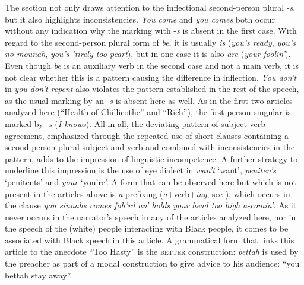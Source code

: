 The section not only draws attention to the inflectional second-person plural -\emph{s}, but it also highlights inconsistencies. \emph{You come} and \emph{you comes} both occur without any indication why the marking with -\emph{s} is absent in the first case. With regard to the second-person plural form of \emph{be}, it is usually \emph{is} (\emph{you’s ready}, \emph{you’s no mounah},\emph{ you’s ’tirely too peart}), but in one case it is also \emph{are} (\emph{your foolin’}). Even though \emph{be} is an auxiliary verb in the second case and not a main verb, it is not clear whether this is a pattern causing the difference in inflection. \emph{You don’t} in \emph{you don’t repent} also violates the pattern established in the rest of the speech, as the usual marking by an -\emph{s} is absent here as well. As in the first two articles analyzed here (“Health of Chillicothe” and “Rich”), the first-person singular is marked by -\emph{s} (\emph{I knows}). All in all, the deviating pattern of subject-verb agreement, emphasized through the repeated use of short clauses containing a second-person plural subject and verb and combined with inconsistencies in the pattern, adds to the impression of linguistic incompetence. A further strategy to underline this impression is the use of eye dialect in \emph{wan’t} ‘want’, \emph{peniten’s} ‘penitents’ and \emph{your} ‘you’re’. A form that can be observed here but which is not present in the articles above is \emph{a}{}-prefixing (\emph{a}+verb+\emph{ing}, see \citealt[96]{CukorAvila2001}), which occurs in the clause \emph{you sinnahs comes foh’rd an’ holds your head too high a-comin’}. As it never occurs in the narrator’s speech in any of the articles analyzed here, nor in the speech of the (white) people interacting with Black people, it comes to be associated with Black speech in this article. A grammatical form that links this article to the anecdote “Too Hasty” is the \textsc{better} construction: \emph{bettah} is used by the preacher as part of a modal construction to give advice to his audience: “you bettah stay away”.


